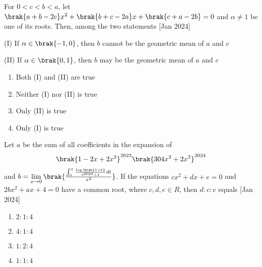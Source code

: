 \iffalse
\title{2024}
\author{AI24BTECH11031}
\section{mcq-single}
\fi

\item For $0 < c < b < a$, let $\brak{a + b - 2c}x^2 + \brak{b + c - 2a}x
    + \brak{c + a - 2b} = 0$ and $\alpha \ne 1$ be one of its roots.
    Then, among the two statements
    \hfill{[Jan 2024]}

    (I) If $\alpha \in \brak{-1, 0}$, then $b$ cannot be the geometric
    mean of $a$ and $c$

    (II) If $\alpha \in \brak{0, 1}$, then $b$ may be the geometric
    mean of $a$ and $c$

    \begin{multicols}{2}
        \begin{enumerate}

            \item Both (I) and (II) are true
            \item Neither (I) nor (II) is true
            \item Only (II) is true
            \item Only (I) is true
        \end{enumerate}
    \end{multicols}

\item Let $a$ be the sum of all coefficients in the expansion of 
    \begin{align*}
    \brak{1 - 2x + 2x^2}^{2023} \brak{3 0 4x^2+2x^3}^{2024}
    \end{align*}
    and $b = \lim\limits_{x \to 0} \brak{\frac{\int_0^x \frac{\log\brak{1+t}}{t^{2024} + 1} dt} {x^2}}$.
    If the equations $cx^2 + dx + e = 0$ and $2bx^2 + ax + 4 = 0$
    have a common root, where $c, d, e \in R$, then $d : c : e$ equals
    \hfill{[Jan 2024]}

    \begin{multicols}{4}
        \begin{enumerate}

            \item $2:1:4$
            \item $4:1:4$
            \item $1:2:4$
            \item $1:1:4$
        \end{enumerate}
    \end{multicols}


